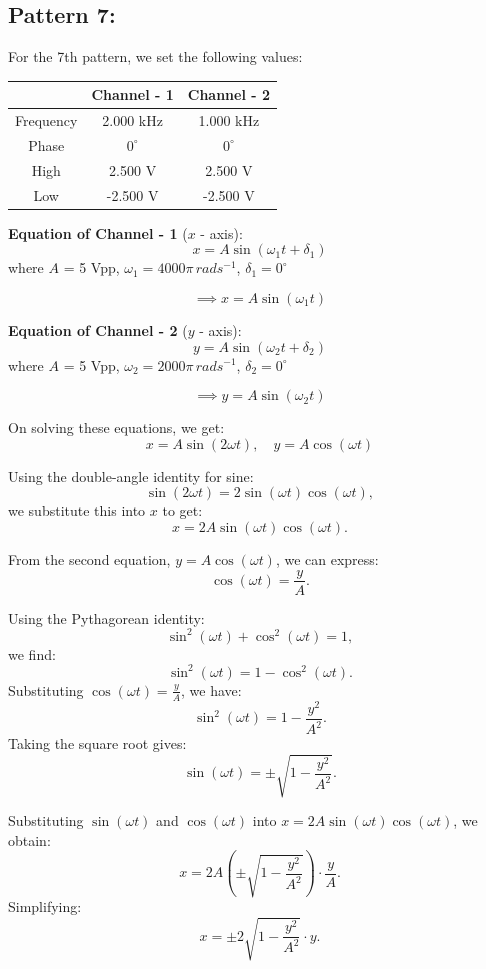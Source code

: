 \documentclass[12pt]{article}
\begin{document}
\subsection{Pattern 7:}
For the 7th pattern, we set the following values:
\begin{table}[H]
    \centering
    \begin{tabular}{|c|c|c|}
    \hline
        & \textbf{Channel - 1} & \textbf{Channel - 2}\\
    \hline
    Frequency & 2.000 kHz & 1.000 kHz\\
    \hline
    Phase     & $0^{\circ}$ & $0^{\circ}$\\
    \hline
    High      & 2.500 V & 2.500 V\\
    \hline
    Low       & -2.500 V & -2.500 V\\
    \hline
    \end{tabular}
\end{table}

\textbf{Equation of Channel - 1} ($x$ - axis):
\[
x = A \sin{\left(\omega_1 t + \delta_1\right)}
\]
where $A$ = 5 Vpp, $\omega_1 = 4000 \pi \, rad s^{-1}$, $\delta_1 = 0^{\circ}$

\[
\implies x = A \sin{\left(\omega_1 t\right)}
\]

\textbf{Equation of Channel - 2} ($y$ - axis):
\[
y = A \sin{\left(\omega_2 t + \delta_2\right)}
\]
where $A$ = 5 Vpp, $\omega_2 = 2000 \pi \, rad s^{-1}$, $\delta_2 = 0^{\circ}$

\[
\implies y = A \sin{\left(\omega_2 t\right)}
\]

On solving these equations, we get:
\[
x = A \sin{\left( 2\omega t\right)}, \quad y = A \cos{\left(\omega t\right)}
\]


Using the double-angle identity for sine:
\[
\sin(2\omega t) = 2\sin(\omega t)\cos(\omega t),
\]
we substitute this into \( x \) to get:
\[
x = 2A \sin(\omega t)\cos(\omega t).
\]

From the second equation, \( y = A \cos(\omega t) \), we can express:
\[
\cos(\omega t) = \frac{y}{A}.
\]

Using the Pythagorean identity:
\[
\sin^2(\omega t) + \cos^2(\omega t) = 1,
\]
we find:
\[
\sin^2(\omega t) = 1 - \cos^2(\omega t).
\]
Substituting \( \cos(\omega t) = \frac{y}{A} \), we have:
\[
\sin^2(\omega t) = 1 - \frac{y^2}{A^2}.
\]
Taking the square root gives:
\[
\sin(\omega t) = \pm \sqrt{1 - \frac{y^2}{A^2}}.
\]

Substituting \( \sin(\omega t) \) and \( \cos(\omega t) \) into \( x = 2A \sin(\omega t)\cos(\omega t) \), we obtain:
\[
x = 2A \left( \pm \sqrt{1 - \frac{y^2}{A^2}} \right) \cdot \frac{y}{A}.
\]
Simplifying:
\[
x = \pm 2 \sqrt{1 - \frac{y^2}{A^2}} \cdot y.
\]
\end{document}
